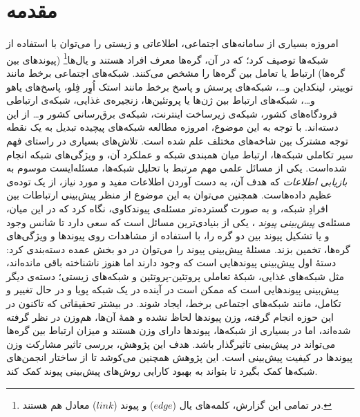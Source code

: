 \section{مقدمه}
امروزه بسیاری از سامانه‌های اجتماعی، اطلاعاتی و زیستی را می‌توان با استفاده از شبکه‌ها توصیف کرد؛ که در آن، گره‌ها معرف افراد هستند و یال‌ها\footnote{در تمامی این گزارش، کلمه‌های یال ($edge$) و پیوند ($link$) معادل هم هستند.} (پیوندهای بین گره‌ها) ارتباط یا تعامل بین گره‌ها را مشخص می‌کنند. شبکه‌های اجتماعی برخط مانند توییتر، لینکداین
و…، شبکه‌های پرسش و پاسخ برخط مانند استک‌ اُوِر فِلو، پاسخ‌های یاهو
و…، شبکه‌های ارتباط بین ژن‌ها یا پروتئین‌ها، زنجیره‌ی غذایی، شبکه‌ی ارتباطی فرودگاه‌های کشور، شبکه‌ی زیرساخت اینترنت، شبکه‌ی برق‌رسانی کشور و… از این دسته‌اند.
با توجه به این موضوع، امروزه مطالعه شبکه‌های پیچیده تبدیل به یک نقطه توجه مشترک بین شاخه‌های مختلف علم شده است. تلاش‌های بسیاری در راستای فهم سیر تکاملی شبکه‌ها، ارتباط میان همبندی شبکه و عملکرد آن، و ویژگی‌های شبکه انجام شده‌است.
یکی از مسائل علمی مهم مرتبط با تحلیل شبکه‌ها، مسئله‌ایست موسوم به \textit{بازیابی اطلاعات} که هدف آن، به دست آوردن اطلاعات مفید و مورد نیاز، از یک توده‌ی عظیم داده‌هاست. همچنین می‌توان به این موضوع از منظر پیش‌بینی ارتباطات بین افرادِ شبکه، و به صورت گسترده‌تر مسئله‌ی پیوندکاوی، نگاه کرد که در این میان، مسئله‌ی \textit{پیش‌بینی پیوند} ، یکی از بنیادی‌ترین مسائل است که سعی دارد تا شانس وجود و یا تشکیل پیوند بین دو گره را، با استفاده از مشاهدات روی پیوند‌ها و ویژگی‌های گره‌ها، تخمین بزند.
  مسئلهٔ پیش‌بینی پیوند را می‌توان در دو بخش عمده دسته‌بندی کرد: دستهٔ اول پیش‌بینی پیوندهایی است که وجود دارند اما هنوز ناشناخته باقی مانده‌اند، مثل شبکه‌های غذایی، شبکهٔ تعاملی پروتئین-پروتئین و شبکه‌های زیستی؛ دسته‌ی دیگر پیش‌بینی پیوندهایی است که ممکن است در آینده در یک شبکه پویا و در حال تغییر و تکامل، مانند شبکه‌های اجتماعی برخط، ایجاد شوند.
در بیشتر تحقیقاتی که تاکنون در این حوزه انجام گرفته، وزن پیوندها لحاظ نشده و همهٔ آن‌ها، هم‌وزن در نظر گرفته شده‌اند، اما در بسیاری از شبکه‌ها، پیوندها دارای وزن هستند و میزان ارتباط بین گره‌ها می‌تواند در پیش‌بینی تاثیرگذار باشد. هدف این پژوهش، بررسی تاثیر مشارکت وزن پیوندها در کیفیت پیش‌بینی است. این پژوهش همچنین می‌کوشد تا از ساختار انجمن‌های شبکه‌ها کمک بگیرد تا بتواند به بهبود کارایی روش‌های پیش‌بینی پیوند کمک کند.
  
 
